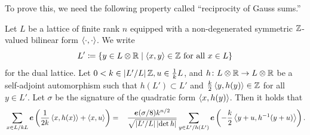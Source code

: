 \documentclass[11pt,a4paper,lualatex]{amsart}
\numberwithin{equation}{section} %
\begin{document}
To prove this, we need the following property called ``reciprocity of Gauss sums.''

\begin{prop}[{\cite[Theorem 1]{DT}}] \label{prop:reciprocity}
	Let $ L $ be a lattice of finite rank $ n $ equipped with a non-degenerated symmetric $ \mathbb{Z} $-valued bilinear form $ \left\langle\cdot, \cdot\right\rangle $.
	We write
	\[
	L' \coloneqq \{ y \in L \otimes \R \mid \sprod{x, y} \in \Z \text{ for all } x \in L \} 
	\]
	for the dual lattice.
	Let $ 0 < k \in \left\lvert L'/L\right\rvert \mathbb{Z}, u \in \frac{1}{k} L $, 
	and $ h \colon L \otimes \mathbb{R} \to L \otimes \mathbb{R} $ be a self-adjoint automorphism such that $ h(L') \subset L' $ and $ \frac{k}{2} \left\langle y, h(y)\right\rangle \in \mathbb{Z} $ for all $ y \in L' $.
	Let $ \sigma $ be the signature of the quadratic form $ \left\langle x, h(y)\right\rangle $.
	Then it holds that
	\begin{align}
		&\sum_{x \in L/kL} \bm{e} \left( \frac{1}{2k} \left\langle x, h(x)\right\rangle + \left\langle x, u\right\rangle \right)
		= \,
		&\frac{\bm{e}(\sigma/8) k^{n/2}}{\sqrt{\left\lvert L'/L\right\rvert \left\lvert\det h\right\rvert}}
		\sum_{y \in L'/h(L')} \bm{e} \left( -\frac{k}{2} \left\langle y + u, h^{-1}(y + u)\right\rangle \right).
	\end{align}
\end{prop}
\end{document}
